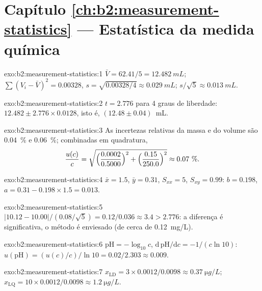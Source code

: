 \section*{Capítulo \ref{ch:b2:measurement-statistics} --- Estatística da medida química}

\begin{solution}{exo:b2:measurement-statistics:1}
$\bar V = 62.41/5 = \qty{12.482}{mL}$; $\sum(V_i - \bar V)^2 = 0.00328$, $s = \sqrt{0.00328/4} \approx
\qty{0.029}{mL}$; $s/\sqrt5 \approx \qty{0.013}{mL}$.
\end{solution}

\begin{solution}{exo:b2:measurement-statistics:2}
$t = 2.776$ para 4 graus de liberdade: $12.482 \pm 2.776 \times 0.0128$, isto é, $(12.48 \pm 0.04)$~mL.
\end{solution}

\begin{solution}{exo:b2:measurement-statistics:3}
As incertezas relativas da massa e do volume são 0.04~\% e 0.06~\%; combinadas em
quadratura,
\[\frac{u(c)}{c} = \sqrt{\Bigl(\frac{0.0002}{0.5000}\Bigr)^2 + \Bigl(\frac{0.15}{250.0}\Bigr)^2}
\approx 0.07~\%.\]
\end{solution}

\begin{solution}{exo:b2:measurement-statistics:4}
$\bar x = 1.5$, $\bar y = 0.31$, $S_{xx} = 5$, $S_{xy} = 0.99$: $b = 0.198$, $a = 0.31 - 0.198 \times 1.5
= 0.013$.
\end{solution}

\begin{solution}{exo:b2:measurement-statistics:5}
$|10.12 - 10.00|/(0.08/\sqrt5) = 0.12/0.036 \approx 3.4 > 2.776$: a diferença é significativa, o
método é enviesado (de cerca de \qty{+0.12}{mg/L}).
\end{solution}

\begin{solution}{exo:b2:measurement-statistics:6}
$\mathrm{pH} = -\log_{10}c$, $\mathrm d\,\mathrm{pH}/\mathrm dc = -1/(c\ln10)$:
$u(\mathrm{pH}) = (u(c)/c)/\ln10 = 0.02/2.303 \approx 0.009$.
\end{solution}

\begin{solution}{exo:b2:measurement-statistics:7}
$x_{\mathrm{LD}} = 3 \times 0.0012/0.0098 \approx \qty{0.37}{\micro g/L}$; $x_{\mathrm{LQ}} = 10
\times 0.0012/0.0098 \approx \qty{1.2}{\micro g/L}$.
\end{solution}

